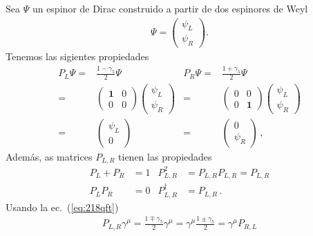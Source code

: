 Sea $\Psi$ un espinor de Dirac construido a partir de dos espinores de Weyl
\begin{align}
  \Psi=
  \begin{pmatrix}
   \psi_L\\
    \psi_R
  \end{pmatrix}.
\end{align}
Tenemos las sigientes propiedades
\begin{align}
   P_L \Psi=& \frac{1-\gamma_5}{2}\Psi & P_R \Psi=& \frac{1+\gamma_5}{2}\Psi \nonumber\\
   =&
   \begin{pmatrix}
    \mathbf{1} & 0 \\
     0 & 0
   \end{pmatrix} \begin{pmatrix}
   \psi_L\\
    \psi_R
  \end{pmatrix} & =&\begin{pmatrix}
    0 & 0 \\
     0 & \mathbf{1}
   \end{pmatrix} \begin{pmatrix}
   \psi_L\\
    \psi_R
  \end{pmatrix}\nonumber\\
  =& \begin{pmatrix}
   \psi_L\\
    0
  \end{pmatrix} & =& \begin{pmatrix}
   0\\
    \psi_R
  \end{pmatrix}\,,
\end{align}
Además,
as matrices $P_{L,R}$ tienen las propiedades
\begin{align}
  P_L+P_R&=1 & P_{L,R}^2&=P_{L,R}P_{L,R}=P_{L,R}\nonumber\\
  P_L P_R&=0& P_{L,R}^\dagger&=P_{L,R}\,.
\end{align}
Usando la ec.~(\ref{eq:218qft})
\begin{align}
  P_{L,R}\gamma^\mu=\frac{1\mp\gamma_5}{2}\gamma^\mu=\gamma^\mu\frac{1\pm\gamma_5}{2}=\gamma^\mu P_{R,L}
\end{align}

